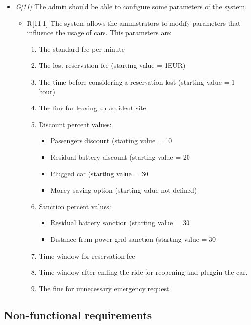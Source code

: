 \begin{itemize}
				\item \textit{G[11]} The admin should be able to configure some parameters of the system.
					\begin{itemize}
						\item R[11.1] The system allows the aministrators to modify parameters that influence the usage of cars. This parameters are:
							\begin{enumerate}
								\item The standard fee per minute
								\item The lost reservation fee (starting value = 1EUR)
								\item The time before considering a reservation lost (starting value = 1 hour)
								\item The fine for leaving an accident site %
								\item Discount percent values:
									\begin{itemize}
										\item Passengers discount (starting value = 10%
										\item Residual battery discount (starting value = 20%
										\item Plugged car (starting value = 30%
										\item Money saving option (starting value not defined)
									\end{itemize}
								\item Sanction percent values:
									\begin{itemize}
										\item Residual battery sanction (starting value = 30%
										\item Distance from power grid sanction (starting value = 30%
									\end{itemize}
								\item Time window for reservation fee
								\item Time window after ending the ride for reopening and pluggin the car.
								\item The fine for unnecessary emergency request.
							\end{enumerate}
					\end{itemize}
\end{itemize}





\subsection{Non-functional requirements}
